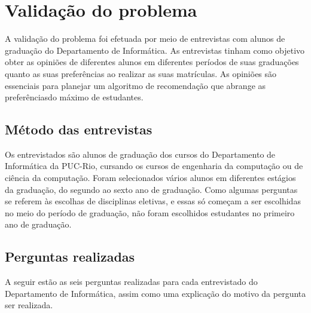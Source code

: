 
\chapter{Validação do problema}
\label{cha:validacao-problema}

A validação do problema foi efetuada por meio de entrevistas com alunos de graduação do Departamento de Informática. As entrevistas tinham como objetivo obter as opiniões de diferentes alunos em diferentes períodos de suas graduações quanto as suas preferências ao realizar as suas matrículas. As opiniões são essenciais para planejar um algoritmo de recomendação que abrange as preferênciasdo máximo de estudantes.

\section{Método das entrevistas}

Os entrevistados são alunos de graduação dos cursos do Departamento de Informática da PUC-Rio, cursando os cursos de engenharia da computação ou de ciência da computação. Foram selecionados vários alunos em diferentes estágios da graduação, do segundo ao sexto ano de graduação. Como algumas perguntas se referem às escolhas de disciplinas eletivas, e essas só começam a ser escolhidas no meio do período de graduação, não foram escolhidos estudantes no primeiro ano de graduação. 

\section{Perguntas realizadas}
A seguir estão as seis perguntas realizadas para cada entrevistado do Departamento de Informática, assim como uma explicação do motivo da pergunta ser realizada.

